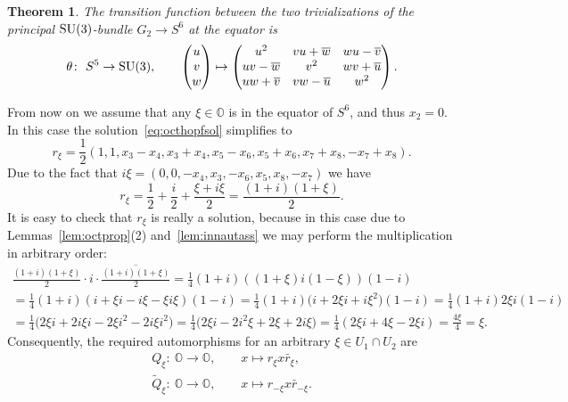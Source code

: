 \documentclass[10pt,a4paper]{amsart}
\numberwithin{equation}{section}
\newtheorem{Theorem}{Theorem}[section]
\newcommand{\SO}{\mathbb{O}} %
\begin{document}
\begin{Theorem} \label{thm:traneq} The transition function between the two trivializations of the principal ${\rm SU}(3)$-bundle $G_2 \rightarrow S^6$ at the equator is
 \begin{gather*}
 \theta\colon \ S^5 \rightarrow {\rm SU}(3), \qquad
 \begin{pmatrix}
 u\\ v\\ w
 \end{pmatrix}\mapsto
 \begin{pmatrix}
 u^2 & vu +\overline{w} &wu-\overline{v}\\
 uv-\overline{w} & v^2 & wv+\overline{u} \\
 uw+\overline{v}& vw-\overline{u} & w^2
 \end{pmatrix}.
 \end{gather*}
\end{Theorem}


From now on we assume that any $\xi \in \SO$ is in the equator of $S^6$, and thus $x_2=0$. In this case the solution~\eqref{eq:octhopfsol} simplifies to
\[
r_\xi= \frac{1}{2} (1, 1,x_3-x_4,x_3+x_4,x_5-x_6,x_5+x_6,x_7 + x_8,-x_7 + x_8 ).
\]
Due to the fact that $i\xi=(0, 0, -x_4, x_3, -x_6, x_5, x_8, -x_7)$ we have
\[r_\xi=\frac{1}{2}+\frac{i}{2}+\frac{\xi+i\xi}{2}=\frac{(1+i)(1+\xi)}{2}.\]
It is easy to check that $r_\xi$ is really a solution, because in this case due to Lemmas~\ref{lem:octprop}(2) and~\ref{lem:innautass} we may perform the multiplication in arbitrary order:
\begin{gather*}
\frac{(1+i)(1+\xi)}{2}\cdot i \cdot \overline{\frac{(1+i)(1+\xi)}{2}} =\frac{1}{4} (1+i) ((1+\xi)i(1-\xi))(1-i) \\
=\frac{1}{4} (1+i)(i+\xi i-i\xi-\xi i \xi)(1-i) = \frac{1}{4} (1+i)\big(i+2\xi i+ i \xi^2\big)(1-i)=\frac{1}{4} (1+i)2\xi i(1-i) \\
=\frac{1}{4}\big(2\xi i + 2 i\xi i -2\xi i^2 - 2 i\xi i^2\big)=\frac{1}{4}\big(2\xi i -2 i^2 \xi +2\xi +2 i \xi \big)=\frac{1}{4}(2\xi i + 4\xi -2\xi i)=\frac{4\xi}{4}=\xi.
\end{gather*}
Consequently, the required automorphisms for an arbitrary $\xi \in U_1 \cap U_2$ are
\begin{gather*} Q_\xi\colon \ \SO \rightarrow \SO,\qquad x \mapsto r_\xi x\bar{r}_\xi, \\
 \tilde{Q}_\xi\colon \ \SO \rightarrow \SO,\qquad x \mapsto r_{-\xi} x\bar{r}_{-\xi}. \end{gather*}
\end{document}
